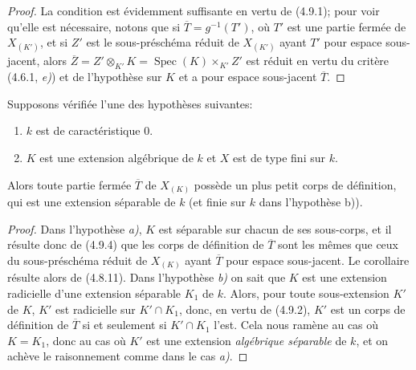 \begin{proof}
La condition est évidemment suffisante en vertu de (4.9.1); pour voir qu'elle
est nécessaire, notons que si $\overline T=g^{-1}(T')$, où $T'$ est une
partie fermée de $X_{(K')}$, et si $Z'$ est le sous-préschéma réduit de
$X_{(K')}$ ayant $T'$ pour espace sous-jacent, alors
$\overline Z=Z'\otimes_{K'}K=\operatorname{Spec}(K)\times_{K'}Z'$ est réduit
en vertu du critère (4.6.1, \emph{e)}) et de l'hypothèse sur $K$ et a pour espace
sous-jacent $\overline T$.
\end{proof}

\begin{corollary}[4.9.5]
\label{IV.2.4.9.5-fr}
Supposons vérifiée l'une des hypothèses suivantes:
\begin{enumerate}
\item[\textup{a)}] $k$ est de caractéristique $0$.
\item[\textup{b)}] $K$ est une extension algébrique de $k$ et $X$ est de type fini sur
$k$.
\end{enumerate}
Alors toute partie fermée $\overline T$ de $X_{(K)}$ possède un plus petit
corps de définition, qui est une extension séparable de $k$ (et finie sur $k$
dans l'hypothèse \textup{b))}.
\end{corollary}

\begin{proof}
Dans l'hypothèse \emph{a)}, $K$ est séparable sur chacun de ses sous-corps, et il
résulte donc de (4.9.4) que les corps de définition de $\overline T$ sont les
mêmes que ceux du sous-préschéma réduit de $X_{(K)}$ ayant $\overline T$ pour
espace sous-jacent. Le corollaire résulte alors de (4.8.11). Dans l'hypothèse
\emph{b)} on sait que $K$ est une extension radicielle d'une extension séparable
$K_1$ de $k$. Alors, pour toute sous-extension $K'$ de $K$, $K'$ est
radicielle sur $K'\cap K_1$, donc, en vertu de (4.9.2), $K'$ est un corps de
définition de $\overline T$ si et seulement si $K'\cap K_1$ l'est. Cela nous
ramène au cas où $K=K_1$, donc au cas où $K'$ est une extension \emph{algébrique
séparable} de $k$, et on achève le raisonnement comme dans le cas \emph{a)}.
\end{proof}

